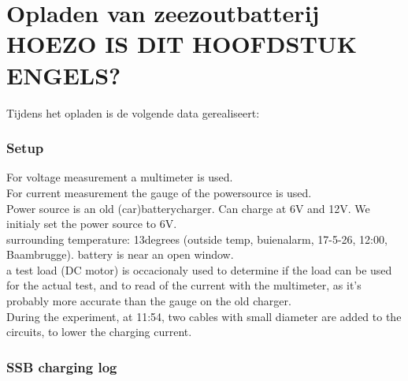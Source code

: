 \chapter{Opladen van zeezoutbatterij HOEZO IS DIT HOOFDSTUK ENGELS?}

Tijdens het opladen is de volgende data gerealiseert:
\subsection{Setup}
For voltage measurement a multimeter is used.\\
For current measurement the gauge of the powersource is used.\\
Power source is an old (car)batterycharger. Can charge at 6V and 12V. We initialy set the power source to 6V.\\
surrounding temperature: 13degrees (outside temp, buienalarm, 17-5-26, 12:00, Baambrugge). battery is near an open window.\\
a test load (DC motor) is occacionaly used to determine if the load can be used for the actual test, and to read of the current with the multimeter, as it's probably more accurate than the gauge on the old charger.\\
During the experiment, at 11:54, two cables with small diameter are added to the circuits, to lower the charging current.

\subsection{SSB charging log}



